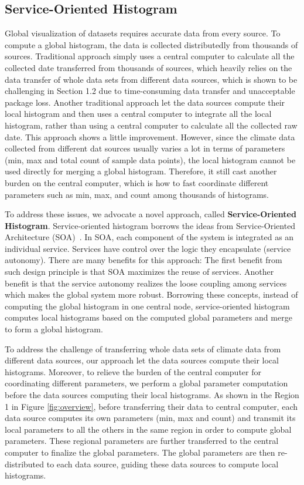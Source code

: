 \documentclass[times, 10pt,onecolumn]{article} %
\begin{document}
\subsection{Service-Oriented Histogram}
Global visualization of datasets requires accurate data from every source. To compute a global histogram, the data is collected distributedly from thousands of sources. Traditional approach simply uses a central computer to calculate all the collected date transferred from thousands of sources, which heavily relies on the data transfer of whole data sets from different data sources, which is shown to be challenging in Section 1.2 due to time-consuming data transfer and unacceptable package loss. Another traditional approach let the data sources compute their local histogram and then uses a central computer to integrate all the local histogram, rather than using a central computer to calculate all the collected raw date. This approach shows a little improvement. However, since the climate data collected from different dat sources usually varies a lot in terms of parameters (min, max and total count of sample data points), the local histogram cannot be used directly for merging a global histogram. Therefore, it still cast another burden on the central computer, which is how to fast coordinate different parameters such as min, max, and count among thousands of histograms.

To address these issues, we advocate a novel approach, called \textbf{Service-Oriented Histogram}. Service-oriented histogram borrows the ideas from Service-Oriented Architecture (SOA)~\cite{soa}. In SOA, each component of the system is integrated as an individual service. Services have control over the logic they encapsulate (service autonomy). There are many benefits for this approach: The first benefit from such design principle is that SOA maximizes the reuse of services. Another benefit is that the service autonomy realizes the loose coupling among services which makes the global system more robust. Borrowing these concepts, instead of computing the global histogram in one central node, service-oriented histogram computes local histograms based on the computed global parameters and merge to form a global histogram. 

To address the challenge of transferring whole data sets of climate data from different data sources, our approach let the data sources compute their local histograms. Moreover, to relieve the burden of the central computer for coordinating different parameters, we perform a global parameter computation before the data sources computing their local histograms. As shown in the Region 1 in Figure \ref{fig:overview}, before transferring their data to central computer, each data source computes its own parameters (min, max and count) and transmit its local parameters to all the others in the same region in order to compute global parameters. These regional parameters are further transferred to the central computer to finalize the global parameters. The global parameters are then re-distributed to each data source, guiding these data sources to compute local histograms.
\end{document}
